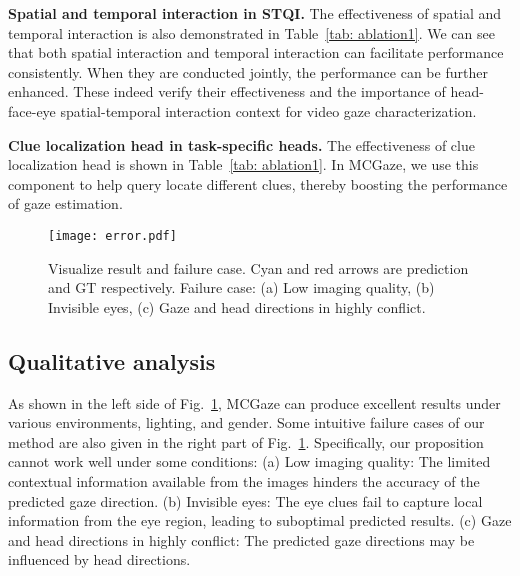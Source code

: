 \documentclass[journal]{IEEEtran}
\begin{document}
\textbf{Spatial and temporal interaction in STQI.} The effectiveness of spatial and temporal interaction is also demonstrated in Table~\ref{tab: ablation1}. We can see that both spatial interaction and temporal interaction can facilitate performance consistently. When they are conducted jointly, the performance can be further enhanced. These indeed verify their effectiveness and the importance of head-face-eye spatial-temporal interaction context for video gaze characterization.

\textbf{Clue localization head in task-specific heads.} The effectiveness of clue localization head is shown in Table~\ref{tab: ablation1}. In MCGaze, we use this component to help query locate different clues, thereby boosting the performance of gaze estimation.
\vspace{-2mm}

\begin{figure}[h]
\centerline{\texttt{[image: error.pdf]}}
\vspace{-2mm}
\caption{Visualize result and failure case. Cyan and red arrows are prediction and GT respectively. Failure case: (a) Low imaging quality, (b) Invisible eyes, (c) Gaze and head directions in highly conflict.}
\label{fig:error}
\vspace{-6mm}
\end{figure}

\subsection{Qualitative analysis}
As shown in the left side of Fig.~\ref{fig:error}, MCGaze can produce excellent results under various environments, lighting, and gender. Some intuitive failure cases of our method are also given in the right part of Fig.~\ref{fig:error}. Specifically, our proposition cannot work well under some conditions: 
(a) Low imaging quality: The limited contextual information available from the images hinders the accuracy of the predicted gaze direction.
(b) Invisible eyes: The eye clues fail to capture local information from the eye region, leading to suboptimal predicted results.
(c) Gaze and head directions in highly conflict: The predicted gaze directions may be influenced by head directions.
\end{document}
